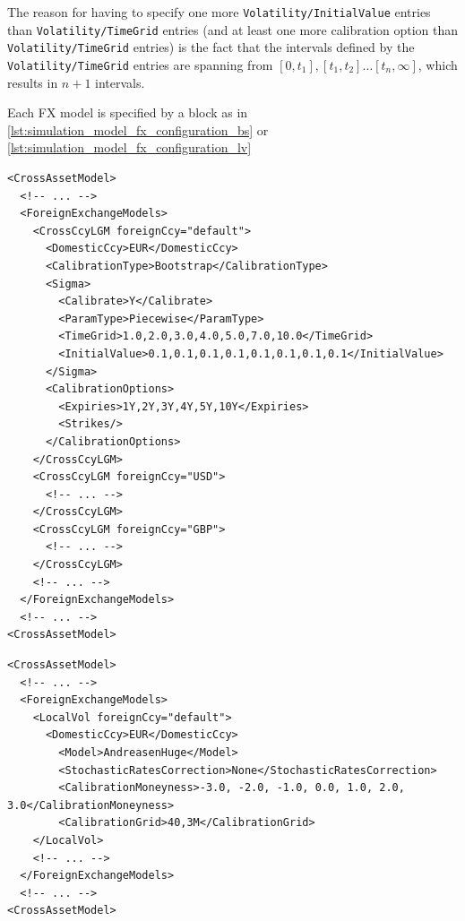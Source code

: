 The reason for having to specify one more {\tt Volatility/InitialValue} entries than {\tt Volatility/TimeGrid} entries (and at least one more calibration option than {\tt Volatility/TimeGrid} entries) is the fact that the intervals defined by the {\tt Volatility/TimeGrid} entries are spanning from $[0,t_1],[t_1,t_2]\ldots[t_n,\infty]$, which results in $n+1$ intervals.

\medskip

Each FX model is specified by a block as in \ref{lst:simulation_model_fx_configuration_bs} or \ref{lst:simulation_model_fx_configuration_lv}

\begin{listing}[H]
\begin{verbatim}
<CrossAssetModel>
  <!-- ... -->
  <ForeignExchangeModels>
    <CrossCcyLGM foreignCcy="default">
      <DomesticCcy>EUR</DomesticCcy>
      <CalibrationType>Bootstrap</CalibrationType>
      <Sigma>
        <Calibrate>Y</Calibrate>
        <ParamType>Piecewise</ParamType>
        <TimeGrid>1.0,2.0,3.0,4.0,5.0,7.0,10.0</TimeGrid>
        <InitialValue>0.1,0.1,0.1,0.1,0.1,0.1,0.1,0.1</InitialValue>
      </Sigma>
      <CalibrationOptions>
        <Expiries>1Y,2Y,3Y,4Y,5Y,10Y</Expiries>
        <Strikes/>
      </CalibrationOptions>
    </CrossCcyLGM>
    <CrossCcyLGM foreignCcy="USD">
      <!-- ... -->
    </CrossCcyLGM>
    <CrossCcyLGM foreignCcy="GBP">
      <!-- ... -->
    </CrossCcyLGM>
    <!-- ... -->
  </ForeignExchangeModels>
  <!-- ... -->
<CrossAssetModel>
\end{verbatim}
\caption{Simulation model FX configuration BlackScholes}
\label{lst:simulation_model_fx_configuration_bs}
\end{listing}

\begin{listing}[H]
\begin{verbatim}
<CrossAssetModel>
  <!-- ... -->
  <ForeignExchangeModels>
    <LocalVol foreignCcy="default">
      <DomesticCcy>EUR</DomesticCcy>
        <Model>AndreasenHuge</Model>
        <StochasticRatesCorrection>None</StochasticRatesCorrection>
        <CalibrationMoneyness>-3.0, -2.0, -1.0, 0.0, 1.0, 2.0, 3.0</CalibrationMoneyness>
        <CalibrationGrid>40,3M</CalibrationGrid>
    </LocalVol>
    <!-- ... -->
  </ForeignExchangeModels>
  <!-- ... -->
<CrossAssetModel>
\end{verbatim}
\caption{Simulation model FX configuration LocalVol}
\label{lst:simulation_model_fx_configuration_lv}
\end{listing}

